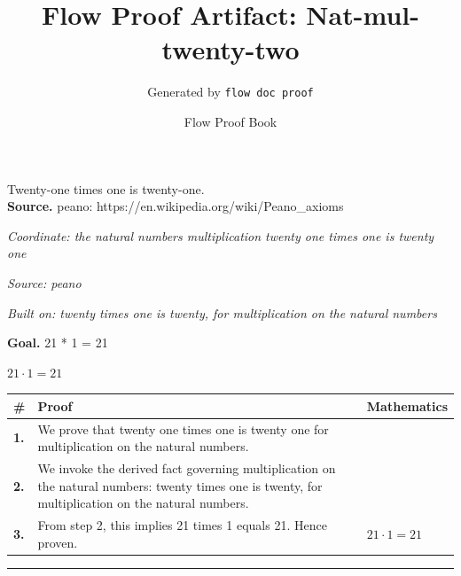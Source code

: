 \documentclass[11pt]{article}
\title{Flow Proof Artifact: Nat-mul-twenty-two}
\author{Generated by \texttt{flow doc proof}}
\date{Flow Proof Book}
\theoremstyle{definition}
\begin{document}
\maketitle
Twenty-one times one is twenty-one.\\[0.5em]
\textbf{Source.} peano: https://en.wikipedia.org/wiki/Peano\_axioms\\[0.5em]
\bigskip
{}\par
\smallskip\noindent\textit{Coordinate: the natural numbers \cdot multiplication \cdot twenty one times one is twenty one}\par
\smallskip\noindent\textit{Source: peano}\par
\smallskip\noindent\textit{Built on: twenty times one is twenty, for multiplication on the natural numbers}\par
\medskip
\noindent\textbf{Goal.} 21 * 1 = 21\par
\noindent$\displaystyle 21 \cdot 1 = 21$\par
\medskip
\noindent
\begin{tabular}{@{} >{\raggedright\arraybackslash}p{} >{\raggedright\arraybackslash}p{} >{\raggedleft\arraybackslash}p{} @{}}
\textbf{\#} & \textbf{Proof} & \textbf{Mathematics} \\
\midrule
\textbf{1.} & We prove that twenty one times one is twenty one for multiplication on the natural numbers. & \\[0.45em]
\textbf{2.} & We invoke the derived fact governing multiplication on the natural numbers: twenty times one is twenty, for multiplication on the natural numbers. & \\[0.45em]
\textbf{3.} & From step 2, this implies 21 times 1 equals 21. Hence proven. & $\displaystyle 21 \cdot 1 = 21$ \\[0.45em]
\bottomrule
\end{tabular}
\label{thm:Nat-multiplication-twenty_one_times_one_is_twenty_one}
\par\medskip\hrule
\end{document}
